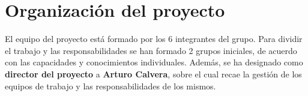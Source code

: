 \documentclass{article}
\begin{document}

\section{Organización del proyecto}

El equipo del proyecto está formado por los 6 integrantes del grupo. 
Para dividir el trabajo y las responsabilidades se han formado 2 grupos iniciales, 
de acuerdo con las capacidades y conocimientos individuales. 
Además, se ha designado como \textbf{director del proyecto} a \textbf{Arturo Calvera}, 
sobre el cual recae la gestión de los equipos de trabajo y las responsabilidades de los mismos.
\end{document}
